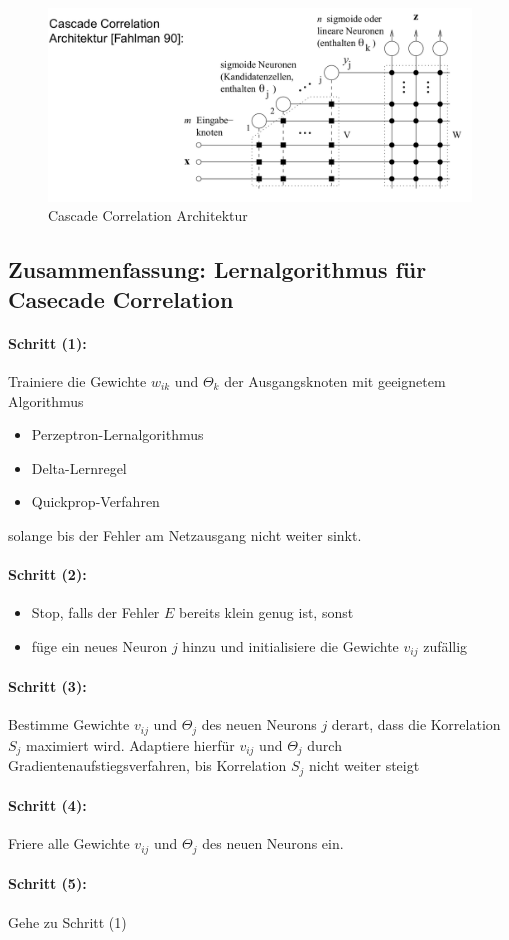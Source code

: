 \begin{figure}[h]
    \centering
    \includegraphics[width=.75\textwidth]{img/NeuroLernregel/cascade_corr_arch.png}
    \caption{Cascade Correlation Architektur}
    \label{ch_lern_cca}
\end{figure}


\subsection{Zusammenfassung: Lernalgorithmus für Casecade Correlation}
\paragraph{Schritt (1):}
Trainiere die Gewichte $w_{ik}$ und $\Theta_k$ der Ausgangsknoten mit geeignetem Algorithmus
\begin{itemize}
    \item Perzeptron-Lernalgorithmus
    \item Delta-Lernregel
    \item Quickprop-Verfahren
\end{itemize}
solange bis der Fehler am Netzausgang nicht weiter sinkt.

\paragraph{Schritt (2):}
\begin{itemize}
    \item Stop, falls der Fehler $E$ bereits klein genug ist, sonst
    \item füge ein neues Neuron $j$ hinzu und initialisiere die Gewichte $v_{ij}$ zufällig
\end{itemize}

\paragraph{Schritt (3):}
Bestimme Gewichte  $v_{ij}$ und $\Theta_j$ des neuen Neurons $j$ derart, dass die Korrelation $S_j$ maximiert wird. Adaptiere hierfür $v_{ij}$ und $\Theta_j$ durch Gradientenaufstiegsverfahren, bis Korrelation $S_j$ nicht weiter steigt

\paragraph{Schritt (4):}
Friere alle Gewichte $v_{ij}$ und $\Theta_j$ des neuen Neurons ein.

\paragraph{Schritt (5):}
Gehe zu Schritt (1)
